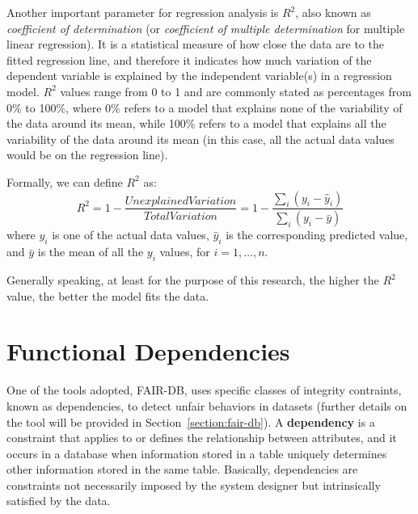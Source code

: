 Another important parameter for regression analysis is \(R^2\), also known as \textit{coefficient of determination} (or \textit{coefficient of multiple determination} for multiple linear regression). It is a statistical measure of how close the data are to the fitted regression line, and therefore it indicates how much variation of the dependent variable is explained by the independent variable(s) in a regression model. \(R^2\) values range from 0 to 1 and are commonly stated as percentages from 0\% to 100\%, where 0\% refers to a model that explains none of the variability of the data around its mean, while 100\% refers to a model that explains all the variability of the data around its mean (in this case, all the actual data values would be on the regression line).

Formally, we can define \(R^2\) as: \[R^2 = 1 - \frac{\mathit{Unexplained Variation}}{\mathit{Total Variation}} = 1 - \frac{\sum_{i}(y_i - \hat{y}_i)}{\sum_{i}(y_i - \bar{y})}\] where \(y_i\) is one of the actual data values, \(\hat{y}_i\) is the corresponding predicted value, and \(\bar{y}\) is the mean of all the \(y_i\) values, for \(i = 1, \ldots, n\).

Generally speaking, at least for the purpose of this research, the higher the \(R^2\) value, the better the model fits the data.


\section{Functional Dependencies}
\label{section:functional_dependencies}
One of the tools adopted, FAIR-DB, uses specific classes of integrity contraints, known as dependencies, to detect unfair behaviors in datasets (further details on the tool will be provided in Section~\ref{section:fair-db}). A \textbf{dependency} is a constraint that applies to or defines the relationship between attributes, and it occurs in a database when information stored in a table uniquely determines other information stored in the same table. Basically, dependencies are constraints not necessarily imposed by the system designer but intrinsically satisfied by the data.

